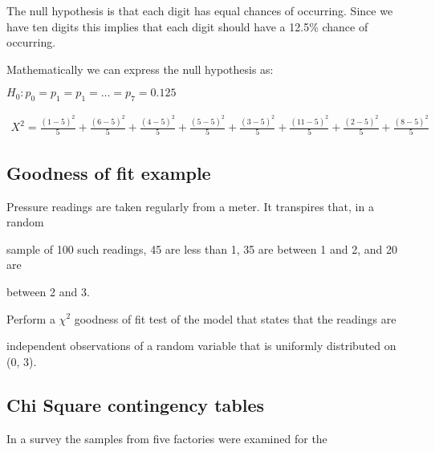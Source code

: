  

The null hypothesis is that each digit has equal chances of occurring. Since we have ten digits this implies that each digit should have a 12.5\% chance of occurring.

 

Mathematically we can express the null hypothesis as:

 

$H_{0}: p_{0} = p_{1} = p_{1}= \dots = p_{7} = 0.125$

 

\begin{eqnarray}

X^2

=\frac{(1 - 5)^2}{5} + \frac{(6 - 5)^2}{5} +\frac{(4 - 5)^2}{5} + \frac{(5 - 5)^2}{5}

 + \frac{(3 - 5)^2}{5}+ \frac{(11 - 5)^2}{5}+ \frac{(2 - 5)^2}{5}+

 \frac{(8 - 5)^2}{5}

\end{eqnarray}

 



\subsection{ Goodness of fit example}

 



Pressure readings are taken regularly from a meter. It transpires that, in a random

sample of 100 such readings, 45 are less than 1, 35 are between 1 and 2, and 20 are

between 2 and 3.

 

Perform a $\chi^2$ goodness of fit test of the model that states that the readings are

independent observations of a random variable that is uniformly distributed on (0, 3).

 



\subsection{Chi Square contingency tables}

 



In a survey the samples from five factories were examined for the

